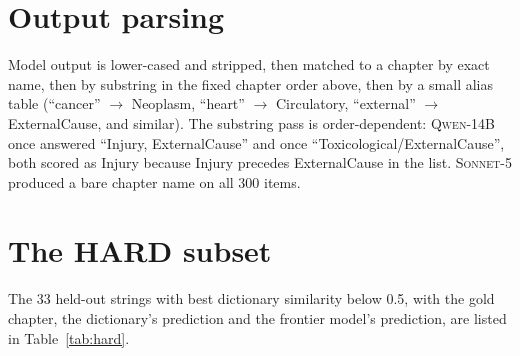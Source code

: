 \documentclass[11pt]{article}
\newcommand{\Mcomm}{\textsc{Sonnet-5}}
\newcommand{\Mlocal}{\textsc{Qwen-14B}}
\begin{document}
\section{Output parsing}

Model output is lower-cased and stripped, then matched to a chapter by exact name, then by substring in the fixed chapter order above, then by a small alias table (``cancer'' $\to$ Neoplasm, ``heart'' $\to$ Circulatory, ``external'' $\to$ ExternalCause, and similar). The substring pass is order-dependent: \Mlocal{} once answered ``Injury, ExternalCause'' and once ``Toxicological/ExternalCause'', both scored as Injury because Injury precedes ExternalCause in the list. \Mcomm{} produced a bare chapter name on all 300 items.

\section{The HARD subset}
\label{app:hard}

The 33 held-out strings with best dictionary similarity below 0.5, with the gold chapter, the dictionary's prediction and the frontier model's prediction, are listed in Table~\ref{tab:hard}.
\end{document}
